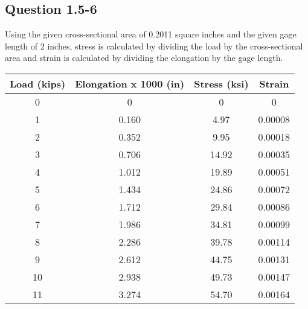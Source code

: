 \documentclass{article}
\begin{document}
    \subsection*{Question 1.5-6}
    Using the given cross-sectional area of 0.2011 square inches and the given gage length of 2 inches, stress is calculated by dividing the load by the cross-sectional area and strain is calculated by dividing the elongation by the gage length. 
    \begin{center}
        \begin{tabular}{|cccc|} 
            \hline
            \textbf{Load (kips)} & \textbf{Elongation x 1000 (in)} & \textbf{Stress (ksi)} & \textbf{Strain}  \\ 
            \hline
            0                    & 0                               & 0                     & 0                \\
            1                    & 0.160                           & 4.97                  & 0.00008          \\
            2                    & 0.352                           & 9.95                  & 0.00018          \\
            3                    & 0.706                           & 14.92                 & 0.00035          \\
            4                    & 1.012                           & 19.89                 & 0.00051          \\
            5                    & 1.434                           & 24.86                 & 0.00072          \\
            6                    & 1.712                           & 29.84                 & 0.00086          \\
            7                    & 1.986                           & 34.81                 & 0.00099          \\
            8                    & 2.286                           & 39.78                 & 0.00114          \\
            9                    & 2.612                           & 44.75                 & 0.00131          \\
            10                   & 2.938                           & 49.73                 & 0.00147          \\
            11                   & 3.274                           & 54.70                 & 0.00164          \\

\end{tabular}
\end{center}
\end{document}
